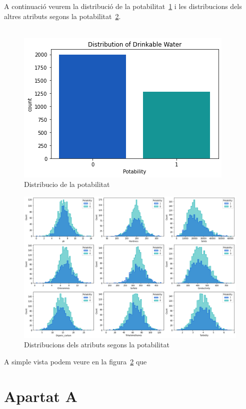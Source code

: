 \documentclass{article}
\begin{document}
	A continuació veurem la distribució de la potabilitat~\ref{fig:distribuciopotabilitat} i les distribucions dels altres atributs segons la potabilitat~\ref{fig:distribucions}.\\
	\\
	\begin{figure}[!h]
		\centering
		\includegraphics[width=0.4\linewidth]{../images/distribucio_potabilitat}
		\caption{Distribucio de la potabilitat}
		\label{fig:distribuciopotabilitat}
	\end{figure}
	\begin{figure}[!h]
		\centering
		\includegraphics[width=0.7\linewidth]{../images/distribucions}
		\caption{Distribucions dels atributs segons la potabilitat}
		\label{fig:distribucions}
	\end{figure}
	A simple vista podem veure en la figura~\ref{fig:distribucions} que
	\newpage
	\section*{Apartat A}

	
	
\end{document}

